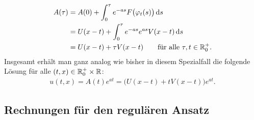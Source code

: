 \begin{align}
A(\tau) &= A(0) +\int_0^\tau e^{-a s} F\bigl( \varphi_t(s) \bigr) \,\mathrm d s\\
&= U(x-t) +\int_0^\tau e^{-a s} e^{as} V(x - t) \,\mathrm d s\\
&= U(x-t) + \tau V(x-t) \qquad \text{für alle $\tau, t \in \mathbb R^+_0.$}
\end{align}
Insgesamt erhält man ganz analog wie bisher in diesem Spezialfall die folgende Lösung für alle $(t,x) \in \mathbb R^+_0 \times \mathbb R$:
\begin{align}\label{appendix:expinhomloes}
u(t,x)= A(t) e^{a t} = \bigl( U(x-t) + t V(x-t) \bigr) e^{a t}.
\end{align}

\subsection{Rechnungen für den regulären Ansatz}
\label{appendix:regulaer:rechnungen}
